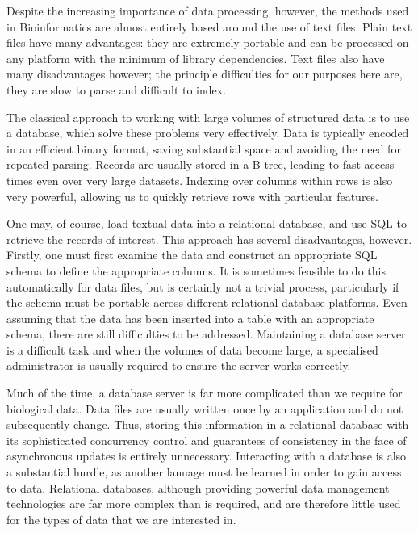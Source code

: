 \documentclass{bioinfo}
\begin{document}
Despite the increasing importance of data processing, however, the methods 
used in Bioinformatics are almost entirely 
based around the use of text files. Plain text files have many advantages:
they are extremely portable and can be processed on 
any platform with the minimum of library dependencies. Text files also 
have many disadvantages however; the principle difficulties for our 
purposes here are, they are slow to parse and difficult to index.


The classical approach to working with large volumes of 
structured data is to use a database, which solve these 
problems very effectively.
Data is typically encoded in an efficient binary 
format, saving substantial space and avoiding the need
for repeated parsing. Records are usually stored in a
B-tree, leading to fast access times even 
over very large datasets. Indexing over columns within rows is 
also very powerful, allowing us to quickly retrieve 
rows with particular features. 

One may, of course, load textual data into a relational database, and 
use SQL to retrieve the records of interest. This approach has several 
disadvantages, however. Firstly, one must first examine the data 
and construct an appropriate SQL schema to define the appropriate columns. 
It is sometimes feasible to do this automatically 
for data files, but is certainly not a trivial process, 
particularly if the schema 
must be portable across different relational database platforms.
Even assuming that the data 
has been inserted into a table with an appropriate schema, there 
are still difficulties to be addressed. Maintaining a database 
server is a difficult task and when the volumes of data become
large, a specialised administrator is usually required to 
ensure the server works correctly.

Much of the time, a database server is far more complicated than
we require for biological data. Data files 
are usually written once by an application 
and do not subsequently change. Thus, storing this information 
in a relational database with its sophisticated concurrency control
and guarantees of consistency in the face of asynchronous updates
is entirely unnecessary. Interacting with a database is also a
substantial hurdle, as another lanuage must be learned in order 
to gain access to data. Relational databases, although providing 
powerful data management technologies are far more complex than 
is required, and are therefore little used for the types of 
data that we are interested in.
\end{document}

